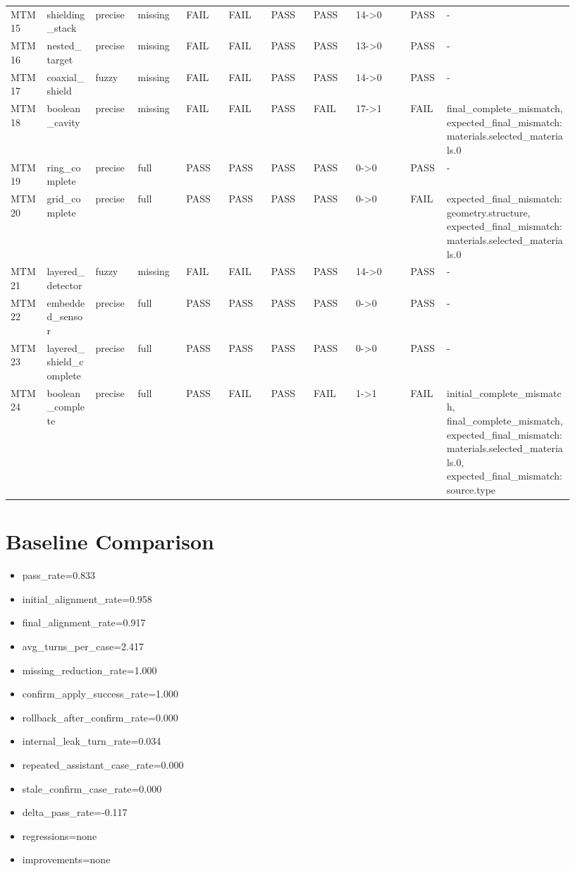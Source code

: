 \documentclass[11pt]{ctexart}
\begin{document}
\begin{longtable}{p{0.06\linewidth}p{0.08\linewidth}p{0.07\linewidth}p{0.08\linewidth}p{0.07\linewidth}p{0.07\linewidth}p{0.07\linewidth}p{0.07\linewidth}p{0.09\linewidth}p{0.06\linewidth}p{0.21\linewidth}}
MTM15 & shielding\_stack & precise & missing & FAIL & FAIL & PASS & PASS & 14->0 & PASS & - \\
MTM16 & nested\_target & precise & missing & FAIL & FAIL & PASS & PASS & 13->0 & PASS & - \\
MTM17 & coaxial\_shield & fuzzy & missing & FAIL & FAIL & PASS & PASS & 14->0 & PASS & - \\
MTM18 & boolean\_cavity & precise & missing & FAIL & FAIL & PASS & FAIL & 17->1 & FAIL & final\_complete\_mismatch, expected\_final\_mismatch:materials.selected\_materials.0 \\
MTM19 & ring\_complete & precise & full & PASS & PASS & PASS & PASS & 0->0 & PASS & - \\
MTM20 & grid\_complete & precise & full & PASS & PASS & PASS & PASS & 0->0 & FAIL & expected\_final\_mismatch:geometry.structure, expected\_final\_mismatch:materials.selected\_materials.0 \\
MTM21 & layered\_detector & fuzzy & missing & FAIL & FAIL & PASS & PASS & 14->0 & PASS & - \\
MTM22 & embedded\_sensor & precise & full & PASS & PASS & PASS & PASS & 0->0 & PASS & - \\
MTM23 & layered\_shield\_complete & precise & full & PASS & PASS & PASS & PASS & 0->0 & PASS & - \\
MTM24 & boolean\_complete & precise & full & PASS & FAIL & PASS & FAIL & 1->1 & FAIL & initial\_complete\_mismatch, final\_complete\_mismatch, expected\_final\_mismatch:materials.selected\_materials.0, expected\_final\_mismatch:source.type \\
\bottomrule
\end{longtable}
\section{Baseline Comparison}
\begin{itemize}
\item pass\_rate=0.833
\item initial\_alignment\_rate=0.958
\item final\_alignment\_rate=0.917
\item avg\_turns\_per\_case=2.417
\item missing\_reduction\_rate=1.000
\item confirm\_apply\_success\_rate=1.000
\item rollback\_after\_confirm\_rate=0.000
\item internal\_leak\_turn\_rate=0.034
\item repeated\_assistant\_case\_rate=0.000
\item stale\_confirm\_case\_rate=0.000
\item delta\_pass\_rate=-0.117
\item regressions=none
\item improvements=none
\end{itemize}
\appendix
\end{document}
